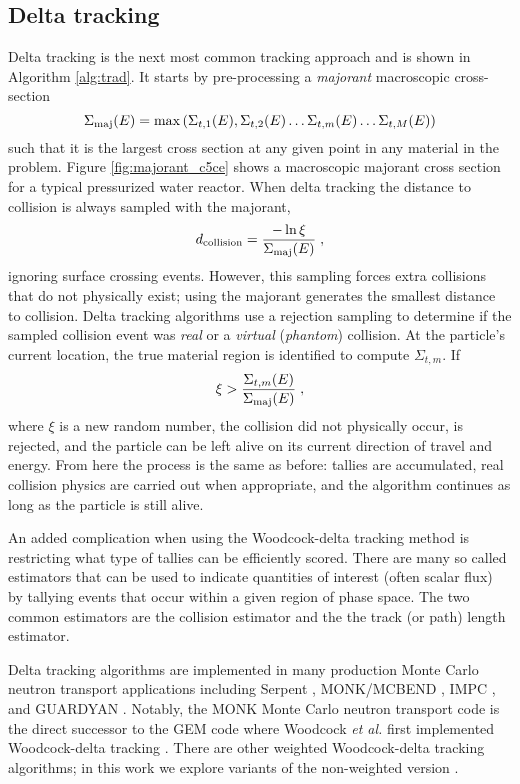 \subsection{Delta tracking}
\label{c5:delta_tracking}

Delta tracking is the next most common tracking approach and is shown in Algorithm \ref{alg:trad}.
It starts by pre-processing a \textit{majorant} macroscopic cross-section
\begin{equation}
    \Sigma_{\text{maj}}(E) = \max\left({\Sigma_{t,1}(E), \Sigma_{t,2}(E) \dots \Sigma_{t,m}(E) \dots \Sigma_{t,M}(E)}\right)
\end{equation}
such that it is the largest cross section at any given point in any material in the problem.
Figure \ref{fig:majorant_c5ce} shows a macroscopic majorant cross section for a typical pressurized water reactor.
When delta tracking the distance to collision is always sampled with the majorant,
\begin{equation}
    d_{\text{collision}} = \frac{-\ln{\xi}}{\Sigma_{\text{maj}}(E)} \; ,
\end{equation}
ignoring surface crossing events.
However, this sampling forces extra collisions that do not physically exist; using the majorant generates the smallest distance to collision.
Delta tracking algorithms use a rejection sampling to determine if the sampled collision event was \textit{real} or a \textit{virtual} (\textit{phantom}) collision.
At the particle's current location, the true material region is identified to compute $\Sigma_{t,m}$.
If 
\begin{equation}
    \xi > \frac{\Sigma_{t,m}(E)}{\Sigma_{\text{maj}}(E)} \; ,
\end{equation}
where $\xi$ is a new random number, the collision did not physically occur, is rejected, and the particle can be left alive on its current direction of travel and energy.
From here the process is the same as before: tallies are accumulated, real collision physics are carried out when appropriate, and the algorithm continues as long as the particle is still alive.

An added complication when using the Woodcock-delta tracking method is restricting what type of tallies can be efficiently scored.
There are many so called estimators that can be used to indicate quantities of interest (often scalar flux) by tallying events that occur within a given region of phase space.
The two common estimators are the collision estimator and the the track (or path) length estimator.

Delta tracking algorithms are implemented in many production Monte Carlo neutron transport applications including Serpent \cite{leppanen_2010_burnup, leppanen_use_2017, leppanen_development_2013, leppanen_2015_serpent}, MONK/MCBEND \cite{richards_monk_2015}, IMPC \cite{fang_development_2022}, and GUARDYAN \cite{molnar_gpu_based_2019}.
Notably, the MONK Monte Carlo neutron transport code is the direct successor to the GEM code where Woodcock \textit{et al.} first implemented Woodcock-delta tracking \cite{woodcock_techniques_1965}.
There are other weighted Woodcock-delta tracking algorithms; in this work we explore variants of the non-weighted version \cite{molnar_variance_2018, morgan_weighted-delta-tracking_2015}.

